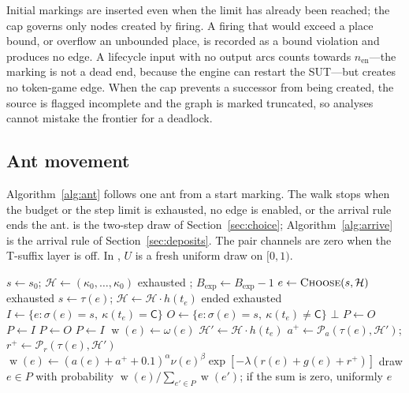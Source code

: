 \documentclass[11pt,a4paper]{article}
\newcommand{\TS}{\mathcal{H}}
\newcommand{\Pair}{\mathcal{P}}
\newcommand{\wgt}{\operatorname{w}}
\begin{document}
Initial markings are inserted even when the limit has already been reached;
the cap governs only nodes created by firing.  A firing that would exceed a
place bound, or overflow an unbounded place, is recorded as a bound violation
and produces no edge.  A lifecycle input with no output arcs counts towards
$n_{\mathrm{en}}$---the marking is not a dead end, because the engine can
restart the SUT---but creates no token-game edge.  When the cap prevents a
successor from being created, the source is flagged incomplete and the graph
is marked truncated, so analyses cannot mistake the frontier for a deadlock.

\subsection{Ant movement}\label{sec:alg-ant}

Algorithm~\ref{alg:ant} follows one ant from a start marking.  The walk stops
when the budget or the step limit is exhausted, no edge is enabled, or the
arrival rule ends the ant.   is the two-step draw of
Section~\ref{sec:choice}; Algorithm~\ref{alg:arrive} is the arrival rule of
Section~\ref{sec:deposits}.  The pair channels are zero when the T-suffix
layer is off.  In , $U$ is a fresh uniform draw on $[0,1)$.

\begin{algorithm}[H]
\footnotesize
\caption{One ant: walk and choice}
\label{alg:ant}
\begin{algorithmic}[1]
  \State $s\gets s_0$; $\TS\gets(\kappa_0,\dots,\kappa_0)$
        \State \Return exhausted
      \EndIf
      \State {}; $B_{\mathrm{exp}}\gets B_{\mathrm{exp}}-1$
    \EndIf
    \State $e\gets\Call{Choose}{s,\TS}$
      \State \Return exhausted
    \EndIf
    \State $s\gets\tau(e)$; $\TS\gets\TS\cdot h(t_e)$
      \State \Return ended
    \EndIf
  \EndFor
  \State \Return exhausted
\EndProcedure
\Statex
\Function{Choose}{$s,\TS$}
  \State $I\gets\{e:\sigma(e)=s,\ \kappa(t_e)=\mathsf{C}\}$
  \State $O\gets\{e:\sigma(e)=s,\ \kappa(t_e)\ne\mathsf{C}\}$
    \State \Return $\bot$
  \EndIf
    \State $P\gets O$
    \State $P\gets I$
    \State $P\gets O$
  \Else
    \State $P\gets I$
  \EndIf
      \State $\wgt(e)\gets\omega(e)$
    \Else
      \State $\TS'\gets\TS\cdot h(t_e)$
      \State $a^+\gets\Pair_a(\tau(e),\TS')$;
             $r^+\gets\Pair_r(\tau(e),\TS')$
      \State $\wgt(e)\gets
             (a(e)+a^++0.1)^{\alpha}\nu(e)^{\beta}
             \exp[-\lambda(r(e)+g(e)+r^+)]$
    \EndIf
  \EndFor
  \State draw $e\in P$ with probability
         $\wgt(e)/\sum_{e'\in P}\wgt(e')$; if the sum is zero, uniformly
  \State \Return $e$
\EndFunction
\end{algorithmic}
\end{algorithm}
\end{document}
